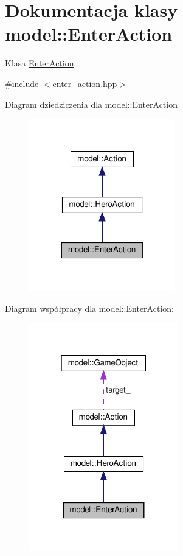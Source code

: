 \hypertarget{classmodel_1_1EnterAction}{}\section{Dokumentacja klasy model\+:\+:Enter\+Action}
\label{classmodel_1_1EnterAction}


Klasa \hyperlink{classmodel_1_1EnterAction}{Enter\+Action}.  




{\ttfamily \#include $<$enter\+\_\+action.\+hpp$>$}



Diagram dziedziczenia dla model\+:\+:Enter\+Action\nopagebreak
\begin{figure}[H]
\begin{center}
\leavevmode
\includegraphics[width=180pt]{classmodel_1_1EnterAction__inherit__graph}
\end{center}
\end{figure}


Diagram współpracy dla model\+:\+:Enter\+Action\+:\nopagebreak
\begin{figure}[H]
\begin{center}
\leavevmode
\includegraphics[width=184pt]{classmodel_1_1EnterAction__coll__graph}
\end{center}
\end{figure}
